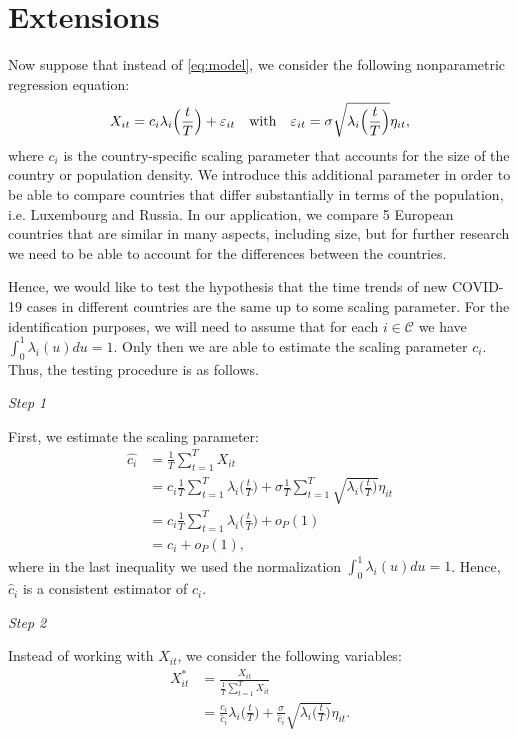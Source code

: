 \documentclass[a4paper,12pt]{article}
\numberwithin{equation}{section}
\begin{document}
{\color{red}
\section{Extensions}
Now suppose that instead of \eqref{eq:model}, we consider the following nonparametric regression equation:
\begin{equation*}
X_{it} = c_i \lambda_i\Big(\frac{t}{T}\Big) + \varepsilon_{it} \quad \text{with} \quad \varepsilon_{it} = \sigma \sqrt{\lambda_i\Big(\frac{t}{T}\Big)} \eta_{it}, 
\end{equation*}
where $c_i$ is the country-specific scaling parameter that accounts for the size of the country or population density. We introduce this additional parameter in order to be able to compare countries that differ substantially in terms of the population, i.e. Luxembourg and Russia. In our application, we compare 5 European countries that are similar in many aspects, including size, but for further research we need to be able to account for the differences between the countries.

Hence, we would like to test the hypothesis that the time trends of new COVID-19 cases in different countries are the same up to some scaling parameter. For the identification purposes, we will need to assume that for each $i \in \mathcal{C}$ we have $\int_0^1 \lambda_i(u)du = 1$. Only then we are able to estimate the scaling parameter $c_i$. Thus, the testing procedure is as follows.

\textit{Step 1}

First, we estimate the scaling parameter:
\begin{align*}
\widehat{c_i} &= \frac{1}{T}\sum_{t = 1}^T X_{it} \\
&= c_i \frac{1}{T}\sum_{t = 1}^T \lambda_i\Big(\frac{t}{T}\Big) + \sigma\frac{1}{T}\sum_{t = 1}^T \sqrt{\lambda_i\Big(\frac{t}{T}\Big)} \eta_{it}\\
& = c_i \frac{1}{T}\sum_{t = 1}^T \lambda_i\Big(\frac{t}{T}\Big) + o_P(1)\\
& = c_i + o_P(1),
\end{align*}
where in the last inequality we used the normalization $\int_0^1 \lambda_i(u)du = 1$. Hence, $\widehat{c}_i$ is a consistent estimator of $c_i$.

\textit{Step 2}

Instead of working with $X_{it}$, we consider the following variables:
\begin{align*}
X^*_{it} &= \frac{X_{it}}{\frac{1}{T}\sum_{t = 1}^T X_{it}} \\
&= \frac{c_i}{\widehat{c}_i} \lambda_i \Big(\frac{t}{T}\Big) + \frac{\sigma}{\widehat{c}_i} \sqrt{\lambda_i\Big(\frac{t}{T}\Big)} \eta_{it}.
\end{align*}

}
\end{document}
